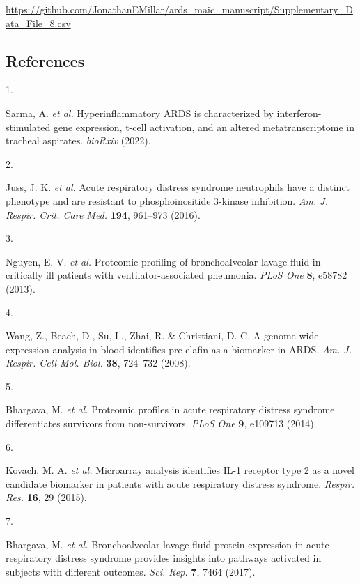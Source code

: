 \documentclass[
  11,
  a4paper,
]{article}
\newlength{\cslhangindent}
\newlength{\csllabelwidth}
\newenvironment{CSLReferences}[2] %
 {\begin{list}{}{%
  \setlength{\itemindent}{0pt}
  \setlength{\leftmargin}{0pt}
  \setlength{\parsep}{0pt}
  \ifodd #1
   \setlength{\leftmargin}{\cslhangindent}
   \setlength{\itemindent}{-1\cslhangindent}
  \fi
  \setlength{\itemsep}{#2\baselineskip}}}
 {\end{list}}
\newcommand{\CSLLeftMargin}[1]{\parbox[t]{\csllabelwidth}{\strut#1\strut}}
\newcommand{\CSLRightInline}[1]{\parbox[t]{\linewidth - \csllabelwidth}{\strut#1\strut}}
\begin{document}
\url{https://github.com/JonathanEMillar/ards_maic_manuscript/Supplementary_Data_File_8.csv}

\newpage

\subsection{References}\label{references}

\label{refs}
\begin{CSLReferences}{0}{0}
\CSLLeftMargin{1. }%
\CSLRightInline{Sarma, A. \emph{et al.} Hyperinflammatory {ARDS} is
characterized by interferon-stimulated gene expression, t-cell
activation, and an altered metatranscriptome in tracheal aspirates.
\emph{bioRxiv} (2022).}

\CSLLeftMargin{2. }%
\CSLRightInline{Juss, J. K. \emph{et al.} Acute respiratory distress
syndrome neutrophils have a distinct phenotype and are resistant to
phosphoinositide 3-kinase inhibition. \emph{Am. J. Respir. Crit. Care
Med.} \textbf{194}, 961--973 (2016).}

\CSLLeftMargin{3. }%
\CSLRightInline{Nguyen, E. V. \emph{et al.} Proteomic profiling of
bronchoalveolar lavage fluid in critically ill patients with
ventilator-associated pneumonia. \emph{PLoS One} \textbf{8}, e58782
(2013).}

\CSLLeftMargin{4. }%
\CSLRightInline{Wang, Z., Beach, D., Su, L., Zhai, R. \& Christiani, D.
C. A genome-wide expression analysis in blood identifies pre-elafin as a
biomarker in {ARDS}. \emph{Am. J. Respir. Cell Mol. Biol.} \textbf{38},
724--732 (2008).}

\CSLLeftMargin{5. }%
\CSLRightInline{Bhargava, M. \emph{et al.} Proteomic profiles in acute
respiratory distress syndrome differentiates survivors from
non-survivors. \emph{PLoS One} \textbf{9}, e109713 (2014).}

\CSLLeftMargin{6. }%
\CSLRightInline{Kovach, M. A. \emph{et al.} Microarray analysis
identifies {IL-1} receptor type 2 as a novel candidate biomarker in
patients with acute respiratory distress syndrome. \emph{Respir. Res.}
\textbf{16}, 29 (2015).}

\CSLLeftMargin{7. }%
\CSLRightInline{Bhargava, M. \emph{et al.} Bronchoalveolar lavage fluid
protein expression in acute respiratory distress syndrome provides
insights into pathways activated in subjects with different outcomes.
\emph{Sci. Rep.} \textbf{7}, 7464 (2017).}


\end{CSLReferences}
\end{document}

